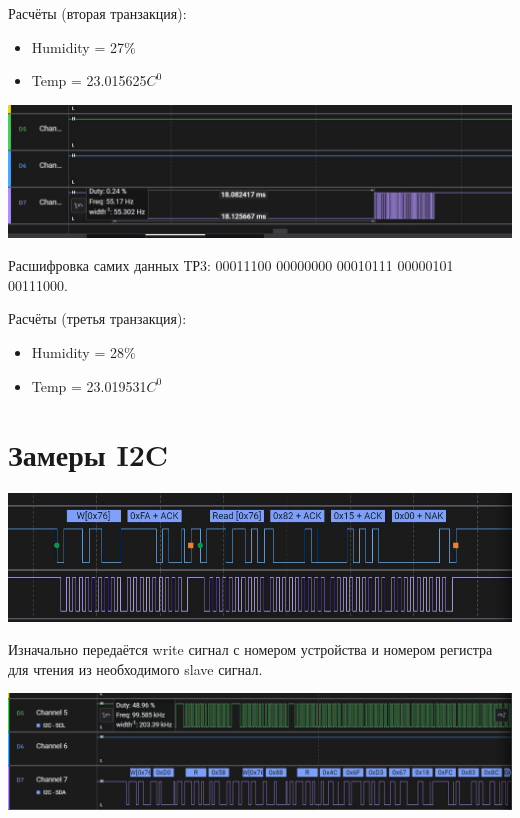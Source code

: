 \documentclass{article}
\begin{document}
Расчёты (вторая транзакция): 
\begin{itemize}
  \item Humidity = 27\%
  \item Temp = 23.015625$C^0$
\end{itemize}

\begin{center}
  \includegraphics[width=.9\textwidth]{dht-11-3}
\end{center}

Расшифровка самих данных ТР3: 00011100 00000000 00010111 00000101 00111000.

Расчёты (третья транзакция): 
\begin{itemize}
  \item Humidity = 28\%
  \item Temp = 23.019531$C^0$
\end{itemize}

\section{Замеры I2C}

\begin{center}
  \includegraphics[width=.9\textwidth]{i2c-1}
\end{center}

Изначально передаётся write сигнал с номером устройства и номером регистра для чтения из необходимого slave сигнал.


\begin{center}
  \includegraphics[width=.9\textwidth]{i2c-2}
\end{center}
\end{document}

